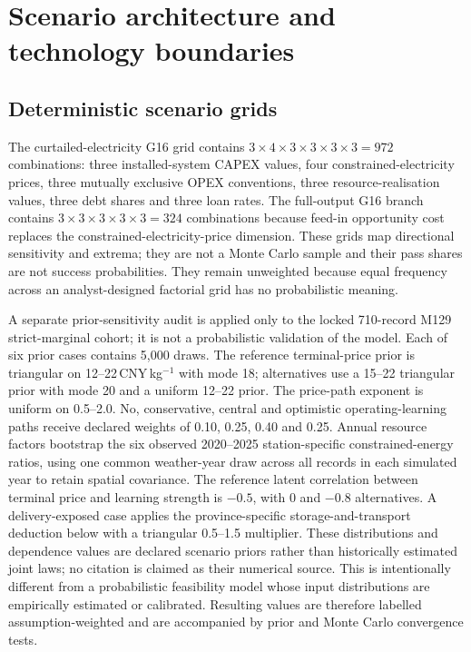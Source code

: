 \documentclass[11pt,a4paper]{article}
\begin{document}
\section{Scenario architecture and technology boundaries}\label{sec:scenarios}

\subsection{Deterministic scenario grids}

The curtailed-electricity G16 grid contains $3\times4\times3\times3\times3\times3=972$ combinations: three installed-system CAPEX values, four constrained-electricity prices, three mutually exclusive OPEX conventions, three resource-realisation values, three debt shares and three loan rates. The full-output G16 branch contains $3\times3\times3\times3\times3=324$ combinations because feed-in opportunity cost replaces the constrained-electricity-price dimension. These grids map directional sensitivity and extrema; they are not a Monte Carlo sample and their pass shares are not success probabilities. They remain unweighted because equal frequency across an analyst-designed factorial grid has no probabilistic meaning.

A separate prior-sensitivity audit is applied only to the locked 710-record M129 strict-marginal cohort; it is not a probabilistic validation of the model. Each of six prior cases contains 5,000 draws. The reference terminal-price prior is triangular on 12--22\,CNY\,kg$^{-1}$ with mode 18; alternatives use a 15--22 triangular prior with mode 20 and a uniform 12--22 prior. The price-path exponent is uniform on 0.5--2.0. No, conservative, central and optimistic operating-learning paths receive declared weights of 0.10, 0.25, 0.40 and 0.25. Annual resource factors bootstrap the six observed 2020--2025 station-specific constrained-energy ratios, using one common weather-year draw across all records in each simulated year to retain spatial covariance. The reference latent correlation between terminal price and learning strength is $-0.5$, with 0 and $-0.8$ alternatives. A delivery-exposed case applies the province-specific storage-and-transport deduction below with a triangular 0.5--1.5 multiplier. These distributions and dependence values are declared scenario priors rather than historically estimated joint laws; no citation is claimed as their numerical source. This is intentionally different from a probabilistic feasibility model whose input distributions are empirically estimated or calibrated\cite{odenweller2022}. Resulting values are therefore labelled assumption-weighted and are accompanied by prior and Monte Carlo convergence tests.
\end{document}
